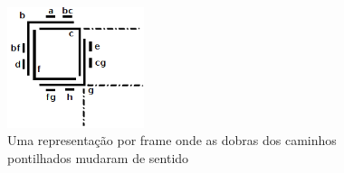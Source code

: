 \begin{figure}[htb]	
\center%
\includegraphics[width=4cm]{./img/outraRepresentacaoFrame3.png}
\caption{Uma representação por frame onde as dobras dos caminhos pontilhados mudaram de sentido}
\label{fig:outraRepresentacaoFrame}
\end{figure}